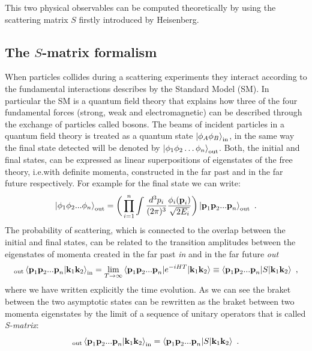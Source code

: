\documentclass[../main/main.tex]{subfiles}
\begin{document}
This two physical observables can be computed theoretically by using the scattering matrix $S$ firstly introduced by Heisenberg.
\subsection{The $S$-matrix formalism}
When particles collides during a scattering experiments they interact according to the fundamental
interactions describes by the Standard Model (SM).
In particular the SM is a quantum field theory that explains how three of the four fundamental forces (strong, weak and electromagnetic) can be described through the exchange of particles called bosons.
\newline
The beams of incident particles in a quantum field theory is treated as a quantum state $\ket{\phi_A\phi_B}_{\text{in}}$, in the same way the final state detected will be denoted by $\ket{\phi_1 \phi_2 \dots \phi_n}_{\text{out}}$. 
Both, the initial and final states, can be expressed as linear superpositions of eigenstates of the free theory, i.e.with definite momenta, constructed in the far past and in the far future respectively.
For example for the final state we can write:
\begin{equation}
	\ket{\phi_1 \phi_2 ...\phi_n}_\text{out} =\bigg( \prod_{i=1}^{n}\int
	 \frac{d^3 p_i}{(2 \pi)^3}
	\frac{\phi_i(\textbf{p}_i)}{\sqrt{2 E_i}} \bigg) \ket{\textbf{p}_1\textbf{p}_2...\textbf{p}_n}_\text{out} \ .
\end{equation}
The probability  of scattering, which is connected to the overlap between the initial and final states, can be related to the transition amplitudes between the eigenstates of momenta created in the far past \emph{in} and in the far future \emph{out}
\begin{equation}
	{}_\text{out}\braket{\textbf{p}_1\textbf{p}_2 ... \textbf{p}_n | \textbf{k}_1 \textbf{k}_2 }_\text{in} = \lim_{T \to \infty} \braket{\textbf{p}_1\textbf{p}_2 ... \textbf{p}_n |e^{- i H T} |\textbf{k}_1 \textbf{k}_2 } \equiv \braket{\textbf{p}_1\textbf{p}_2 ... \textbf{p}_n |S |\textbf{k}_1 \textbf{k}_2 } \ ,
\end{equation} 
where we have written explicitly the time evolution. As we can see the braket between the two asymptotic states can be rewritten as the braket between two momenta eigenstates by the limit of a sequence of unitary operators that is called \emph{S-matrix}:
\begin{equation}
	{}_\text{out}\braket{\textbf{p}_1\textbf{p}_2 ... \textbf{p}_n | \textbf{k}_1 \textbf{k}_2 }_\text{in} =  \braket{\textbf{p}_1\textbf{p}_2 ... \textbf{p}_n |S |\textbf{k}_1 \textbf{k}_2 } \ .
\end{equation} 
\end{document}
